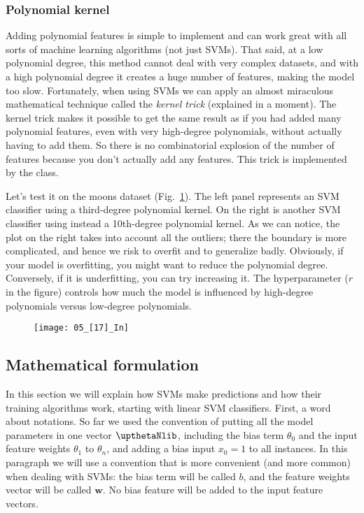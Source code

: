 \subsubsection{Polynomial kernel}
Adding polynomial features is simple to implement and can work great with all sorts of machine learning algorithms (not just SVMs). That said, at a low polynomial degree, this method cannot deal with very complex datasets, and with a high polynomial degree it creates a huge number of features, making the model too slow. Fortunately, when using SVMs we can apply an almost miraculous mathematical technique called the \emph{kernel trick} (explained in a moment). The kernel trick makes it possible to get the same result as if you had added many polynomial features, even with very high-degree polynomials, without actually having to add them. So there is no combinatorial explosion of the number of features because you don't actually add any features. This trick is implemented by the  class.

Let's test it on the moons dataset (Fig.~\ref{05_[17]_In}). The left panel represents an SVM classifier using a third-degree polynomial kernel. On the right is another SVM classifier using instead a 10th-degree polynomial kernel. As we can notice, the plot on the right takes into account all the outliers; there the boundary is more complicated, and hence we risk to overfit and to generalize badly. Obviously, if your model is overfitting, you might want to reduce the polynomial degree. Conversely, if it is underfitting, you can try increasing it. The hyperparameter  ($r$ in the figure) controls how much the model is influenced by high-degree polynomials versus low-degree polynomials.
\begin{figure}[h!t]
\centering
\texttt{[image: 05\_[17]\_In]}
\caption{}\label{05_[17]_In}
\end{figure}
\subsection{Mathematical formulation}
In this section we will explain how SVMs make predictions and how their training algorithms work, starting with linear SVM classifiers. First, a word about notations. So far we used the convention of putting all the model parameters in one vector $\boldtheta$, including the bias term $\theta_0$ and the input feature weights $\theta_1$ to $\theta_n$, and adding a bias input $x_0=1$ to all instances. In this paragraph we will use a convention that is more convenient (and more common) when dealing with SVMs: the bias term will be called $b$, and the feature weights vector will be called $\mathbf{w}$. No bias feature will be added to the input feature vectors.
